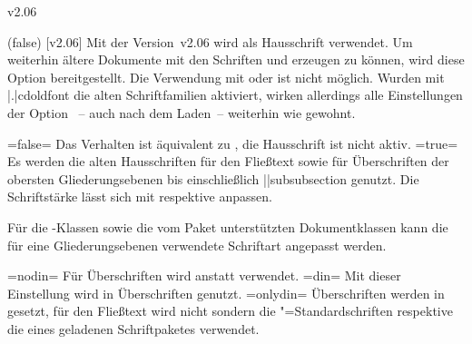 \begin{Entity}{}
\begin{NoIndexDefault}
\begin{Cessations}{v2.06}
\begin{Declaration}
  {}
  (false)
  [v2.06]
\printdeclarationlist
%
Mit der Version~v2.06 wird \OpenSans als Hausschrift verwendet. Um weiterhin 
ältere Dokumente mit den Schriften \Univers und \DIN erzeugen zu können, wird 
diese Option bereitgestellt.
Die Verwendung mit  oder  ist nicht möglich. 
Wurden mit \Option|.|{cdoldfont} die alten Schriftfamilien aktiviert, wirken 
allerdings alle Einstellungen der Option ~-- auch nach dem 
Laden~-- weiterhin wie gewohnt.
%
\begin{DeclareValues}
\itemval=false=
  Das Verhalten ist äquivalent zu , die Hausschrift ist 
  nicht aktiv.
\itemval*=true=
  Es werden die alten Hausschriften \Univers für den Fließtext sowie \DIN für 
  Überschriften der obersten Gliederungsebenen bis einschließlich 
  \Macro||{subsubsection} genutzt. Die Schriftstärke lässt sich mit 
   respektive  anpassen.
\end{DeclareValues}
%
Für die \TUDScript-Klassen sowie die vom Paket  
unterstützten Dokumentklassen kann die für eine Gliederungsebenen verwendete 
Schriftart angepasst werden.
%
\begin{DeclareValues}
\itemval=nodin=
  Für Überschriften wird \Univers anstatt \DIN verwendet.
\itemval=din=
  Mit dieser Einstellung wird \DIN in Überschriften genutzt. 
\itemval=onlydin=
  Überschriften werden in \DIN gesetzt, für den Fließtext wird nicht \Univers 
  sondern die "=Standardschriften respektive die eines geladenen 
  Schriftpaketes verwendet.
\end{DeclareValues}
\end{Declaration}


\end{Cessations}
\end{NoIndexDefault}
\end{Entity}
